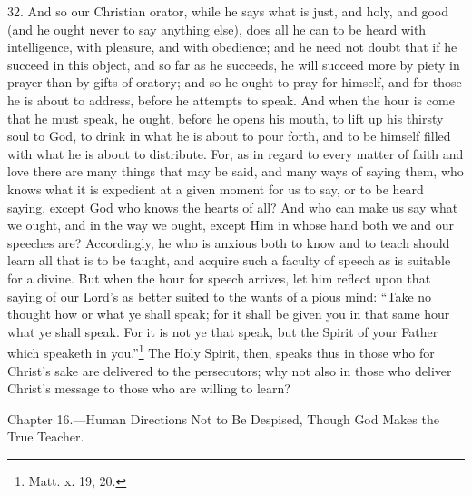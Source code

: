 32. And so our Christian orator, while he says what is just, and holy, and good (and he ought never to say anything else), does all he can to be heard with intelligence, with pleasure, and with obedience; and he need not doubt that if he succeed in this object,  and so far as he succeeds, he will succeed more by piety in prayer than by gifts of oratory; and so he ought to pray for himself, and for those he is about to address, before he attempts to speak. And when the hour is come that he must speak, he ought, before he opens his mouth, to lift up his thirsty soul to God, to drink in what he is about to pour forth, and to be himself filled with what he is about to distribute. For, as in regard to every matter of faith and love there are many things that may be said, and many ways of saying them, who knows what it is expedient at a given moment for us to say, or to be heard saying, except God who knows the hearts of all? And who can make us say what we ought, and in the way we ought, except Him in whose hand both we and our speeches are? Accordingly, he who is anxious both to know and to teach should learn all that is to be taught, and acquire such a faculty of speech as is suitable for a divine. But when the hour for speech arrives, let him reflect upon that saying of our Lord’s as better suited to the wants of a pious mind: “Take no thought how or what ye shall speak; for it shall be given you in that same hour what ye shall speak. For it is not ye that speak, but the Spirit of your Father which speaketh in you.”\footnote{Matt. x. 19, 20.} The Holy Spirit, then, speaks thus in those who for Christ’s sake are delivered to the persecutors; why not also in those who deliver Christ’s message to those who are willing to learn?


Chapter 16.—Human Directions Not to Be Despised, Though God Makes the True Teacher.


